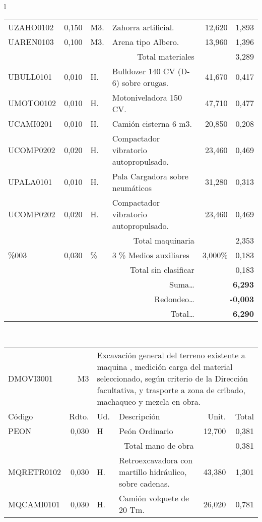 \documentclass{book}%
\begin{document}
\begin{longtable}{l}
\begin{tabular}{l r l p{60mm} r r}
UZAHO0102&     0,150&M3.&Zahorra artificial.&    12,620&     1,893\\%
UAREN0103&     0,100&M3.&Arena tipo Albero.&    13,960&     1,396\\%
\multicolumn{4}{r}{Total materiales}&&     3,289\\%
UBULL0101&     0,010&H.&Bulldozer 140 CV (D{-}6) sobre orugas.&    41,670&     0,417\\%
UMOTO0102&     0,010&H.&Motoniveladora 150 CV.&    47,710&     0,477\\%
UCAMI0201&     0,010&H.&Camión cisterna 6 m3.&    20,850&     0,208\\%
UCOMP0202&     0,020&H.&Compactador vibratorio autopropulsado.&    23,460&     0,469\\%
UPALA0101&     0,010&H.&Pala Cargadora sobre neumáticos&    31,280&     0,313\\%
UCOMP0202&     0,020&H.&Compactador vibratorio autopropulsado.&    23,460&     0,469\\%
\multicolumn{4}{r}{Total maquinaria}&&     2,353\\%
\%003&     0,030&\%&3 \% Medios auxiliares&     3,000\%&     0,183\\%
\multicolumn{4}{r}{Total sin clasificar}&&     0,183\\%
\multicolumn{4}{r}{Suma\ldots}&\multicolumn{2}{r}{\textbf{     6,293}}\\%
\multicolumn{4}{r}{Redondeo\ldots}&\multicolumn{2}{r}{\textbf{    {-}0,003}}\\%
\multicolumn{4}{r}{Total\ldots}&\multicolumn{2}{r}{\textbf{     6,290}}\\%
\end{tabular}\\%
\begin{tabular}{l r l p{60mm} r r}%
DMOVI3001&M3&\multicolumn{4}{p{95mm}}{Excavación general del terreno existente a maquina , medición carga del material seleccionado, según criterio de la Dirección facultativa, y trasporte a zona de cribado, machaqueo y mezcla en obra.}\\%
Código&Rdto.&Ud.&Descripción&Unit.&Total\\%
\hline%
PEON&     0,030&H&Peón Ordinario&    12,700&     0,381\\%
\multicolumn{4}{r}{Total mano de obra}&&     0,381\\%
MQRETR0102&     0,030&H.&Retroexcavadora con martillo hidráulico, sobre cadenas.&    43,380&     1,301\\%
MQCAMI0101&     0,030&H.&Camión volquete de 20 Tm.&    26,020&     0,781\\%

\end{tabular}
\end{longtable}
\end{document}
